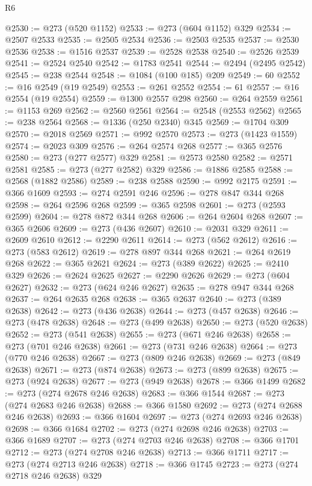 \begin{lexlean}{R6}
\begin{coremodule}
{{{{{{{{{{{{{{{{{{{@2530 := @273 (@520 @1152)
@2533 := @273 (@604 @1152) @329
@2534 := @2507 @2533
@2535 := @2505 @2534
@2536 := @2503 @2535
@2537 := @2530 @2536
@2538 := @1516 @2537
@2539 := @2528 @2538
@2540 := @2526 @2539
@2541 := @2524 @2540
@2542 := @1783 @2541
@2544 := @2494 (@2495 @2542)
@2545 := @238 @2544
@2548 := @1084 (@100 @185) @209
@2549 := 60
@2552 := @16 @2549 (@19 @2549)
@2553 := @261 @2552
@2554 := 61
@2557 := @16 @2554 (@19 @2554)
@2559 := @1300 @2557 @298
@2560 := @264 @2559
@2561 := @1153 @269
@2562 := @2560 @2561
@2564 := @2548 (@2553 @2562)
@2565 := @238 @2564
@2568 := @1336 (@250 @2340) @345
@2569 := @1704 @309
@2570 := @2018 @2569
@2571 := @992 @2570
@2573 := @273 (@1423 @1559)
@2574 := @2023 @309
@2576 := @264 @2574 @268
@2577 := @365 @2576
@2580 := @273 (@277 @2577) @329
@2581 := @2573 @2580
@2582 := @2571 @2581
@2585 := @273 (@277 @2582) @329
@2586 := @1886 @2585
@2588 := @2568 (@1882 @2586)
@2589 := @238 @2588
@2590 := @992 @2175
@2591 := @366 @1609
@2593 := @274 @2591 @246
@2596 := @278 @847 @344 @268
@2598 := @264 @2596 @268
@2599 := @365 @2598
@2601 := @273 (@2593 @2599)
@2604 := @278 @872 @344 @268
@2606 := @264 @2604 @268
@2607 := @365 @2606
@2609 := @273 (@436 @2607)
@2610 := @2031 @329
@2611 := @2609 @2610
@2612 := @2290 @2611
@2614 := @273 (@562 @2612)
@2616 := @273 (@583 @2612)
@2619 := @278 @897 @344 @268
@2621 := @264 @2619 @268
@2622 := @365 @2621
@2624 := @273 (@389 @2622)
@2625 := @2410 @329
@2626 := @2624 @2625
@2627 := @2290 @2626
@2629 := @273 (@604 @2627)
@2632 := @273 (@624 @246 @2627)
@2635 := @278 @947 @344 @268
@2637 := @264 @2635 @268
@2638 := @365 @2637
@2640 := @273 (@389 @2638)
@2642 := @273 (@436 @2638)
@2644 := @273 (@457 @2638)
@2646 := @273 (@478 @2638)
@2648 := @273 (@499 @2638)
@2650 := @273 (@520 @2638)
@2652 := @273 (@541 @2638)
@2655 := @273 (@671 @246 @2638)
@2658 := @273 (@701 @246 @2638)
@2661 := @273 (@731 @246 @2638)
@2664 := @273 (@770 @246 @2638)
@2667 := @273 (@809 @246 @2638)
@2669 := @273 (@849 @2638)
@2671 := @273 (@874 @2638)
@2673 := @273 (@899 @2638)
@2675 := @273 (@924 @2638)
@2677 := @273 (@949 @2638)
@2678 := @366 @1499
@2682 := @273 (@274 @2678 @246 @2638)
@2683 := @366 @1544
@2687 := @273 (@274 @2683 @246 @2638)
@2688 := @366 @1580
@2692 := @273 (@274 @2688 @246 @2638)
@2693 := @366 @1604
@2697 := @273 (@274 @2693 @246 @2638)
@2698 := @366 @1684
@2702 := @273 (@274 @2698 @246 @2638)
@2703 := @366 @1689
@2707 := @273 (@274 @2703 @246 @2638)
@2708 := @366 @1701
@2712 := @273 (@274 @2708 @246 @2638)
@2713 := @366 @1711
@2717 := @273 (@274 @2713 @246 @2638)
@2718 := @366 @1745
@2723 := @273 (@274 @2718 @246 @2638) @329
}}}}}}}}}}}}}}}}}}}
\end{coremodule}
\end{lexlean}
